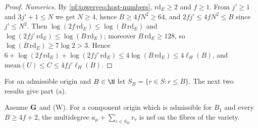 \begin{proof}
\emph{Numerics.} By \cref{pf:towergeo:host-numbers}, $\mathrm{rd}_E\ge2$ and $f\ge1$. From $j'\ge1$ and
$3j'+1\le N$ we get $N\ge4$, hence $B\ge4fN^2\ge64$, and $2fj'\le4fN^2\le B$ since $j'\le N^2$. Then
$\log(2f\,\mathrm{rd}_E)\le\log(B\,\mathrm{rd}_E)$ and $\log(2fj'\,\mathrm{rd}_E)\le\log(B\,\mathrm{rd}_E)$;
moreover $B\,\mathrm{rd}_E\ge128$, so $\log(B\,\mathrm{rd}_E)\ge7\log2>3$. Hence
$6+\log(2f\,\mathrm{rd}_E)+\log(2fj'\,\mathrm{rd}_E)\le4\log(B\,\mathrm{rd}_E)\le4\ell_H(B)$, and
$\mathrm{mean}(U)\le C\le4fj'\ell_H(B)$.
\end{proof}

For an admissible origin and $B\in\N$ let $S_B=\{r\in S:r\le B\}$. The next two results give part (a).

\begin{proposition}\label{pf:towergeo:idu}
Assume $\mathbf G$ and \textup{(W)}. For a component origin which is admissible for $B_1$ and every $B\ge4f+2$, the
multidegree $a_\mu+\sum_{r\in S_B}v_r$ is nef on the fibres of the variety.
\end{proposition}

